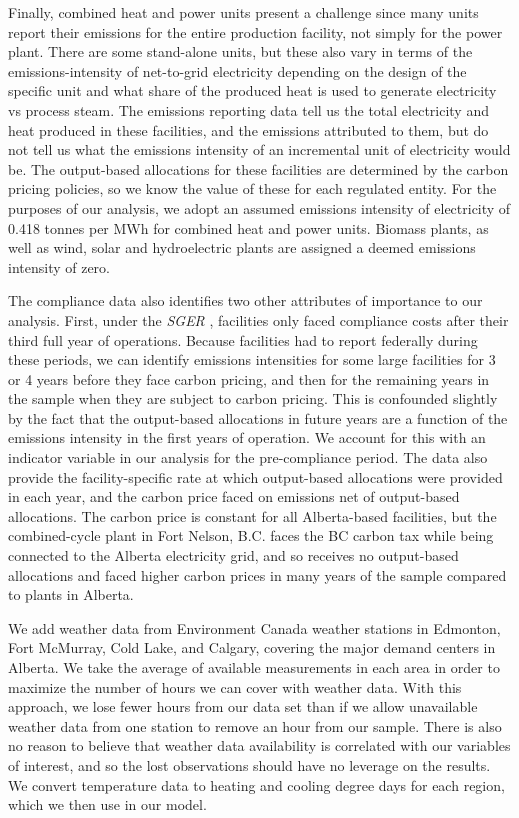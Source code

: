 \documentclass[12pt]{article}
\newcommand{\SGER}{\textit{SGER} }
\begin{document}
Finally, combined heat and power units present a challenge since many units report their emissions for the entire production facility, not simply for the power plant. There are some stand-alone units, but these also vary in terms of the emissions-intensity of net-to-grid electricity depending on the design of the specific unit and what share of the produced heat is used to generate electricity vs process steam. The emissions reporting data tell us the total electricity and heat produced in these facilities, and the emissions attributed to them, but do not tell us what the emissions intensity of an incremental unit of electricity would be. The output-based allocations for these facilities are determined by the carbon pricing policies, so we know the value of these for each regulated entity. For the purposes of our analysis, we adopt an assumed emissions intensity of electricity of 0.418 tonnes per MWh for combined heat and power units. Biomass plants, as well as wind, solar and hydroelectric plants are assigned a deemed emissions intensity of zero.

The compliance data also identifies two other attributes of importance to our analysis. First, under the \SGER, facilities only faced compliance costs after their third full year of operations. Because facilities had to report federally during these periods, we can identify emissions intensities for some large facilities for 3 or 4 years before they face carbon pricing, and then for the remaining years in the sample when they are subject to carbon pricing. This is confounded slightly by the fact that the output-based allocations in future years are a function of the emissions intensity in the first years of operation. We account for this with an indicator variable in our analysis for the pre-compliance period. The data also provide the facility-specific rate at which output-based allocations were provided in each year, and the carbon price faced on emissions net of output-based allocations. The carbon price is constant for all Alberta-based facilities, but the combined-cycle plant in Fort Nelson, B.C. faces the BC carbon tax while being connected to the Alberta electricity grid, and so receives no output-based allocations and faced higher carbon prices in many years of the sample compared to plants in Alberta.

We add weather data from Environment Canada weather stations in Edmonton, Fort McMurray, Cold Lake, and Calgary, covering the major demand centers in Alberta.  We take the average of available measurements in each area in order to maximize the number of hours we can cover with weather data. With this approach, we lose fewer hours from our data set than if we allow unavailable weather data from one station to remove an hour from our sample. There is also no reason to believe that weather data availability is correlated with our variables of interest, and so the lost observations should have no leverage on the results. We convert temperature data to heating and cooling degree days for each region, which we then use in our model.
\end{document}
